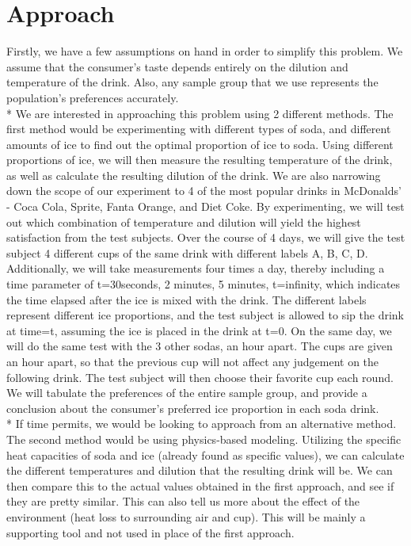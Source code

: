 \documentclass[12pt,letterpaper]{article}
\theoremstyle{definition}
\begin{document}
\section{Approach}
Firstly, we have a few assumptions on hand in order to simplify this problem. We assume that the consumer's taste depends entirely on the dilution and temperature of the drink. Also, any sample group that we use represents the population's preferences accurately.
\\* We are interested in approaching this problem using 2 different methods. The first method would be experimenting with different types of soda, and different amounts of ice to find out the optimal proportion of ice to soda. Using different proportions of ice, we will then measure the resulting temperature of the drink, as well as calculate the resulting dilution of the drink. We are also narrowing down the scope of our experiment to 4 of the most popular drinks in McDonalds' - Coca Cola, Sprite, Fanta Orange, and Diet Coke. By experimenting, we will test out which combination of temperature and dilution will yield the highest satisfaction from the test subjects. Over the course of 4 days, we will give the test subject 4 different cups of the same drink with different labels A, B, C, D. Additionally, we will take measurements four times a day, thereby including a time parameter of t=30seconds, 2 minutes, 5 minutes, t=infinity, which indicates the time elapsed after the ice is mixed with the drink. The different labels represent different ice proportions, and the test subject is allowed to sip the drink at time=t, assuming the ice is placed in the drink at t=0. On the same day, we will do the same test with the 3 other sodas, an hour apart. The cups are given an hour apart, so that the previous cup will not affect any judgement on the following drink. The test subject will then choose their favorite cup each round. We will tabulate the preferences of the entire sample group, and provide a conclusion about the consumer's preferred ice proportion in each soda drink.
\\* If time permits, we would be looking to approach from an alternative method. The second method would be using physics-based modeling. Utilizing the specific heat capacities of soda and ice (already found as specific values), we can calculate the different temperatures and dilution that the resulting drink will be. We can then compare this to the actual values obtained in the first approach, and see if they are pretty similar. This can also tell us more about the effect of the environment (heat loss to surrounding air and cup). This will be mainly a supporting tool and not used in place of the first approach.
\end{document}
